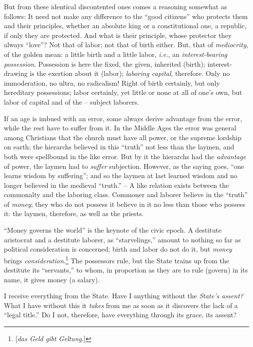 \documentclass[12pt,a4paper]{book}
\begin{document}
But from these identical discontented ones comes a reasoning somewhat as 
follows: It need not make any difference to the ``good citizens'' who 
protects them and their principles, whether an absolute king or a 
constitutional one, a republic, if only they are protected. And what is their 
principle, whose protector they always ``love''? Not that of labor; not that 
of birth either. But, that of \textit{mediocrity}, of the golden mean: a 
little birth and a little labor, \textit{i.e.}, an \textit{interest-bearing 
possession}. Possession is here the fixed, the given, inherited (birth); 
interest-drawing is the exertion about it (labor); \textit{laboring capital}, 
therefore. Only no immoderation, no ultra, no radicalism! Right of birth 
certainly, but only hereditary possessions; labor certainly, yet little or 
none at all of one's own, but labor of capital and of the -- subject laborers.

If an age is imbued with an error, some always derive advantage from the 
error, while the rest have to suffer from it. In the Middle Ages the error was 
general among Christians that the church must have all power, or the supreme 
lordship on earth; the hierarchs believed in this ``truth'' not less than 
the laymen, and both were spellbound in the like error. But by it the 
hierarchs had the \textit{advantage} of power, the laymen had to 
\textit{suffer} subjection. However, as the saying goes, ``one learns wisdom 
by suffering''; and so the laymen at last learned wisdom and no longer 
believed in the medieval ``truth.'' -- A like relation exists between the 
commonalty and the laboring class. Commoner and laborer believe in the 
``truth'' of \textit{money}; they who do not possess it believe in it no 
less than those who possess it: the laymen, therefore, as well as the priests.

``Money governs the world'' is the keynote of the civic epoch. A destitute 
aristocrat and a destitute laborer, as ``starvelings,'' amount to nothing so 
far as political consideration is concerned; birth and labor do not do it, but 
\textit{money} brings \textit{consideration}.\footnote{[\textit{das Geld gibt 
Geltung}.]} The possessors rule, but the State trains up from the destitute 
its ``servants,'' to whom, in proportion as they are to rule (govern) in its 
name, it gives money (a salary).

I receive everything from the State. Have I anything without the 
\textit{State's assent?} What I have without this it \textit{takes} from me as 
soon as it discovers the lack of a ``legal title.'' Do I not, therefore, 
have everything through its grace, its assent?
\end{document}

